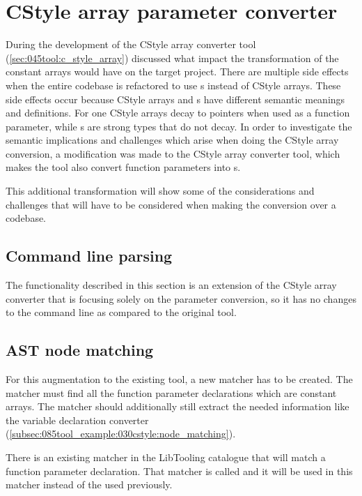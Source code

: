 
\section{CStyle array parameter converter}

During the development of the CStyle array converter tool (\cref{sec:045tool:c_style_array}) discussed what impact the transformation of the constant arrays would have on the target project. There are multiple side effects when the entire codebase is refactored to use s instead of CStyle arrays. These side effects occur because CStyle arrays and s have different semantic meanings and definitions. For one CStyle arrays decay to pointers when used as a function parameter, while s are strong types that do not decay. In order to investigate the semantic implications and challenges which arise when doing the CStyle array conversion, a modification was made to the CStyle array converter tool, which makes the tool also convert function parameters into s.

This additional transformation will show some of the considerations and challenges that will have to be considered when making the conversion over a codebase.

\subsection{Command line parsing}

The functionality described in this section is an extension of the CStyle array converter that is focusing solely on the parameter conversion, so it has no changes to the command line as compared to the original tool.

\subsection{AST node matching}

For this augmentation to the existing tool, a new matcher has to be created. The matcher must find all the function parameter declarations which are constant arrays. The matcher should additionally still extract the needed information like the variable declaration converter (\cref{subsec:085tool_example:030cstyle:node_matching}).

There is an existing matcher in the LibTooling catalogue that will match a function parameter declaration. That matcher is called  and it will be used in this matcher instead of the  used previously.

